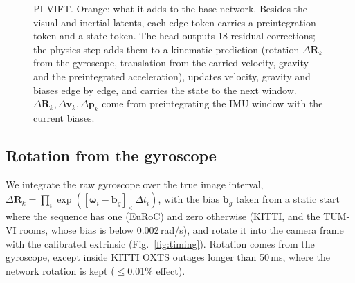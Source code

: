 \documentclass[letterpaper,journal]{IEEEtran}
\begin{document}
\begin{figure}[t]
\caption{PI-VIFT. Orange: what it adds to the base network. Besides the visual and inertial latents, each edge token carries a preintegration token and a state token. The head outputs 18 residual corrections; the physics step adds them to a kinematic prediction (rotation $\Delta\mathbf R_k$ from the gyroscope, translation from the carried velocity, gravity and the preintegrated acceleration), updates velocity, gravity and biases edge by edge, and carries the state to the next window. $\Delta\mathbf R_k,\Delta\mathbf v_k,\Delta\mathbf p_k$ come from preintegrating the IMU window with the current biases.}
\label{fig:pivift}
\end{figure}

\subsection{Rotation from the gyroscope}
We integrate the raw gyroscope over the true image interval, $\Delta\mathbf{R}_k=\prod_i \exp([\bar{\boldsymbol{\omega}}_i-\mathbf{b}_g]_\times\,\Delta t_i)$, with the bias $\mathbf{b}_g$ taken from a static start where the sequence has one (EuRoC) and zero otherwise (KITTI, and the TUM-VI rooms, whose bias is below 0.002\,rad/s), and rotate it into the camera frame with the calibrated extrinsic (Fig.~\ref{fig:timing}). Rotation comes from the gyroscope, except inside KITTI OXTS outages longer than 50\,ms, where the network rotation is kept ($\le$0.01\% effect).
\end{document}
